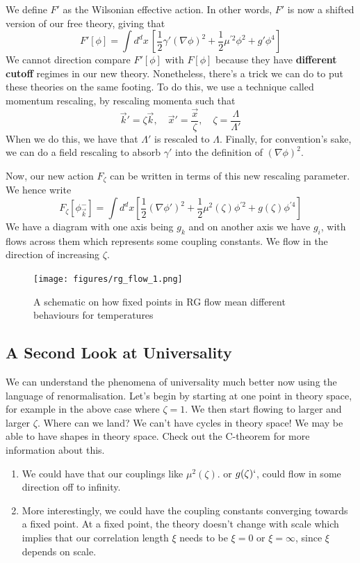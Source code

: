 \documentclass[11pt, oneside]{article}   	%
\begin{document}
We define $ F' $ as the Wilsonian effective action.
In other words, 
$ F '$  is now a shifted version of our free theory, giving that 
\[
	F ' [ \phi ] = \int d^ d x \, \left[  \frac{1}{2 } \gamma ' ( \nabla \phi ) ^ 2 + \frac{1}{2 } \mu^{ ' 2 } \phi ^ 2 + g ' \phi ^ 4  \right] 
\] We cannot direction compare $ F ' [ \phi ] $ with $ F [ \phi ] $
because they have  \textbf{different cutoff } regimes in 
our new theory. 
Nonetheless, there's a trick we can do to put 
these theories on the same footing. 
To do this, we use a technique called 
momentum rescaling, by rescaling momenta such that 
\[
 \vec{k} ' = \zeta \vec{k}, \quad \vec{x} ' = \frac{\vec{x} }{ \zeta }, \quad \zeta = \frac{ \Lambda }{ \Lambda ' } 
\] When we do this, we have that $ \Lambda' $ is rescaled to $ \Lambda$. 
Finally, for convention's sake, we can do a field rescaling to 
absorb  $ \gamma ' $ into the definition of $ (  \nabla \phi ) ^ 2 $. 

Now, our new action $ F_{ \zeta } $ can be written in terms of this new 
rescaling parameter. We hence write 
\[
	F_{ \zeta } [ \phi_{ \vec{k} } ^ - ] = \int d^ d x \left[  \frac{1}{2 } ( \nabla \phi' ) ^ 2 + \frac{1}{2 } \mu ^ 2 ( \zeta ) \phi ^{ ' 2 } + g ( \zeta ) \phi ^{ ' 4 }  \right] 
\] We have a diagram with one axis being $ g_k $ and on another axis we 
have $ g_ i $, with flows across them which represents some coupling constants. 
We flow in the direction of increasing $ \zeta  $. 

\begin{figure}[h]
	\centering
	\texttt{[image: figures/rg\_flow\_1.png]}
	\caption{A schematic on how fixed points in RG flow mean different behaviours for temperatures}
\end{figure}

\subsection{A Second Look at Universality} 
We can understand the phenomena of universality 
much better now using the language of renormalisation. 
Let's begin by starting at one point in theory space, for example 
in the above case where $ \zeta = 1 $. 
We then start flowing to larger and larger $ \zeta $. 
Where can we land? 
We can't have cycles in theory space! We may be able to have 
shapes in theory space. 
Check out the C-theorem for more information about this. 
\begin{enumerate}
	\item We could have that our couplings like $ \mu^ 2 ( \zeta ) $. or $ g ( \zeta) `$, 
		could flow in some direction off to infinity. 
	\item More interestingly, we could have the coupling constants 
		converging towards a fixed point. At a fixed point, 
		the theory doesn't change with scale which implies that our correlation 
		length  $ \xi $ needs to be $ \xi = 0 $ or  $ \xi = \infty$, 
		since $ \xi $ depends on scale. 
\end{enumerate}
\end{document}
